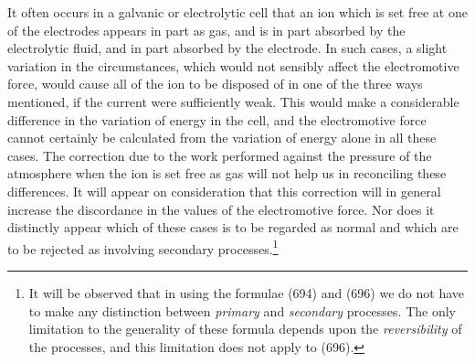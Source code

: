 \documentclass[12pt]{memoir}
\begin{document}
It often occurs in a galvanic or electrolytic cell that an ion which is set free at one of the electrodes appears in part as gas, and is in part absorbed by the electrolytic fluid, and in part absorbed by the electrode.   In such cases, a slight variation in the circumstances, which would not sensibly affect the electromotive force, would cause all of the ion to be disposed of in one of the three ways mentioned, if the current were sufficiently weak. This would make a considerable difference in the variation of energy in the cell, and the electromotive force cannot certainly be calculated from the variation of energy alone in all these cases. The correction due to the work performed against the pressure of the atmosphere when the ion is set free as gas will not help us in reconciling these differences. It will appear on consideration that this correction will in general increase the discordance in the values of the electromotive force. Nor does it distinctly appear which of these cases is to be regarded as normal and which are to be rejected as involving secondary processes.\footnote{It will be observed that in using the formulae (694) and (696) we do not have to make any distinction between \textit{primary} and \textit{secondary} processes. The only limitation to the generality of these formula depends upon the \textit{reversibility} of the processes, and this limitation does not apply to (696).}
\end{document}
